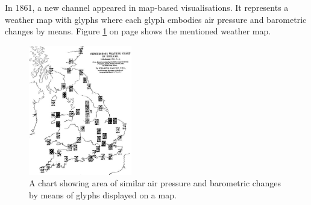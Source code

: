 In 1861, a new channel appeared in map-based visualisations. It represents a weather map with glyphs where each glyph embodies air pressure and barometric changes by means. Figure \ref{fig:weather-map} on page \pageref{fig:weather-map} shows the mentioned weather map.

\begin{figure}[!htb]
\centering
\includegraphics[width=0.4\textwidth,keepaspectratio]{images/history/weather.jpg}
\caption[
    A chart showing area of similar air pressure and barometric changes by means of glyphs displayed on a map., Urldate: 07.2016 \newline
\small\texttt{\url{http://datavis.ca/milestones//admin/uploads/images/galton-weather-charts2.gif}}
]{A chart showing area of similar air pressure and barometric changes by means of glyphs displayed on a map.}
\label{fig:weather-map}
\end{figure}

